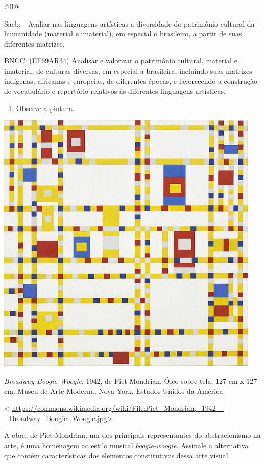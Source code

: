 \begin{itemize}
\begin{itemize}
\begin{escolha}[]{@{}ll@{}}
{{{{{{{{Saeb: - Avaliar nas linguagens artísticas a diversidade do patrimônio
cultural da humanidade (material e imaterial), em especial o brasileiro,
a partir de suas diferentes matrizes.

BNCC: (EF69AR34) Analisar e valorizar o patrimônio cultural, material e
imaterial, de culturas diversas, em especial a brasileira, incluindo
suas matrizes indígenas, africanas e europeias, de diferentes épocas, e
favorecendo a construção de vocabulário e repertório relativos às
diferentes linguagens artísticas.

\begin{enumerate}
\def\labelenumi{\arabic{enumi}.}
\item
  Observe a pintura.
\end{enumerate}

\includegraphics[width=4.96875in,height=5.01042in]{media/image40.png}

\emph{Broadway Boogie-Woogie}, 1942, de Piet Mondrian. Óleo sobre tela,
127 cm x 127 cm. Museu de Arte Moderna, Nova York, Estados Unidos da
América.

\textless{}
\url{https://commons.wikimedia.org/wiki/File:Piet_Mondrian,_1942_-_Broadway_Boogie_Woogie.jpg}\textgreater{}

A obra, de Piet Mondrian, um dos principais representantes do
abstracionismo na arte, é uma homenagem ao estilo musical
\emph{boogie-woogie}. Assinale a alternativa que contém características
dos elementos constitutivos dessa arte visual.

}}}}}}}}
\end{escolha}
\end{itemize}
\end{itemize}
